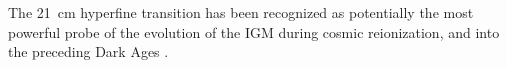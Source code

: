 \documentclass[preprint]{aastex}
\begin{document}
The 21~cm hyperfine transition has been recognized as potentially the most
powerful probe of the evolution of the IGM during cosmic reionization, and into
the preceding Dark Ages \citep{morales_wyithe2010,furlanetto_et_al2006}.
\end{document}
